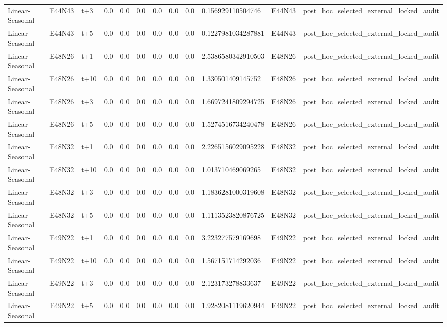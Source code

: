\begin{landscape}
\begin{longtable}{llllllllllll}
Linear-Seasonal & E44N43 & t+3 & 0.0 & 0.0 & 0.0 & 0.0 & 0.0 & 0.0 & 0.156929110504746 & E44N43 & post\_hoc\_selected\_external\_locked\_audit \\
Linear-Seasonal & E44N43 & t+5 & 0.0 & 0.0 & 0.0 & 0.0 & 0.0 & 0.0 & 0.1227981034287881 & E44N43 & post\_hoc\_selected\_external\_locked\_audit \\
Linear-Seasonal & E48N26 & t+1 & 0.0 & 0.0 & 0.0 & 0.0 & 0.0 & 0.0 & 2.5386580342910503 & E48N26 & post\_hoc\_selected\_external\_locked\_audit \\
Linear-Seasonal & E48N26 & t+10 & 0.0 & 0.0 & 0.0 & 0.0 & 0.0 & 0.0 & 1.330501409145752 & E48N26 & post\_hoc\_selected\_external\_locked\_audit \\
Linear-Seasonal & E48N26 & t+3 & 0.0 & 0.0 & 0.0 & 0.0 & 0.0 & 0.0 & 1.6697241809294725 & E48N26 & post\_hoc\_selected\_external\_locked\_audit \\
Linear-Seasonal & E48N26 & t+5 & 0.0 & 0.0 & 0.0 & 0.0 & 0.0 & 0.0 & 1.5274516734240478 & E48N26 & post\_hoc\_selected\_external\_locked\_audit \\
Linear-Seasonal & E48N32 & t+1 & 0.0 & 0.0 & 0.0 & 0.0 & 0.0 & 0.0 & 2.2265156029095228 & E48N32 & post\_hoc\_selected\_external\_locked\_audit \\
Linear-Seasonal & E48N32 & t+10 & 0.0 & 0.0 & 0.0 & 0.0 & 0.0 & 0.0 & 1.013710469069265 & E48N32 & post\_hoc\_selected\_external\_locked\_audit \\
Linear-Seasonal & E48N32 & t+3 & 0.0 & 0.0 & 0.0 & 0.0 & 0.0 & 0.0 & 1.1836281000319608 & E48N32 & post\_hoc\_selected\_external\_locked\_audit \\
Linear-Seasonal & E48N32 & t+5 & 0.0 & 0.0 & 0.0 & 0.0 & 0.0 & 0.0 & 1.1113523820876725 & E48N32 & post\_hoc\_selected\_external\_locked\_audit \\
Linear-Seasonal & E49N22 & t+1 & 0.0 & 0.0 & 0.0 & 0.0 & 0.0 & 0.0 & 3.223277579169698 & E49N22 & post\_hoc\_selected\_external\_locked\_audit \\
Linear-Seasonal & E49N22 & t+10 & 0.0 & 0.0 & 0.0 & 0.0 & 0.0 & 0.0 & 1.567151714292036 & E49N22 & post\_hoc\_selected\_external\_locked\_audit \\
Linear-Seasonal & E49N22 & t+3 & 0.0 & 0.0 & 0.0 & 0.0 & 0.0 & 0.0 & 2.123173278833637 & E49N22 & post\_hoc\_selected\_external\_locked\_audit \\
Linear-Seasonal & E49N22 & t+5 & 0.0 & 0.0 & 0.0 & 0.0 & 0.0 & 0.0 & 1.9282081119620944 & E49N22 & post\_hoc\_selected\_external\_locked\_audit \\

\end{longtable}
\end{landscape}
